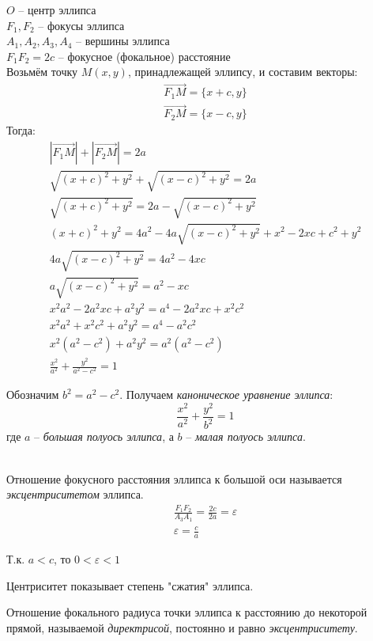 $O$ -- центр эллипса \\
 $F_1, F_2$ -- фокусы эллипса \\
 $A_1, A_2, A_3, A_4$ -- вершины эллипса \\
$F_1F_2 = 2c$  -- фокусное (фокальное) расстояние\\
Возьмём точку $M(x, y)$, принадлежащей эллипсу, и составим векторы:
\begin{gather*}
  \overrightarrow{F_1M} = \{x + c, y\} \\
  \overrightarrow{F_2M} = \{x - c, y\}
\end{gather*}
Тогда:
\begin{gather*}
  |\overrightarrow{F_1M}| + |\overrightarrow{F_2M}| = 2a \\
  \sqrt{(x + c)^2 + y^2} + \sqrt{(x - c)^2 + y^2} = 2a \\
  \sqrt{(x + c)^2 + y^2} = 2a - \sqrt{(x - c)^2 + y^2} \\
  (x + c)^2 + y^2 = 4a^2 - 4a\sqrt{(x - c)^2 + y^2} + x^2 - 2xc + c^2 + y^2 \\
  4a\sqrt{(x - c)^2 + y^2} = 4a^2 - 4xc \\
  a\sqrt{(x - c)^2 + y^2} = a^2 - xc \\
  x^2 a^2 - 2a^2xc + a^2y^2 = a^4 - 2a^2xc + x^2c^2 \\
  x^2a^2 + x^2c^2 + a^2y^2 = a^4 - a^2c^2 \\
  x^2(a^2 - c^2) + a^2y^2 = a^2(a^2 - c^2) \\
  \frac{x^2}{a^2} + \frac{y^2}{a^2 - c^2} = 1
\end{gather*} 

Обозначим $b^2 = a^2 - c^2$. Получаем \textit{каноническое уравнение эллипса}: \[
  \boxed{\frac{x^2}{a^2} + \frac{y^2}{b^2} = 1}
\]  
где $a$ -- \textit{большая полуось эллипса}, а  $b$ -- \textit{малая полуось эллипса}.


\\
Отношение фокусного расстояния эллипса к большой оси называется \textit{эксцентриситетом} эллипса.
\begin{gather*}
  \frac{F_1F_2}{A_3A_1} = \frac{2c}{2a} = \varepsilon \\
  \boxed{\varepsilon = \frac{c}{a}}
\end{gather*}
\begin{note}
  Т.к. $a < c$, то $0 < \varepsilon < 1$
\end{note}

Центриситет показывает степень "сжатия" эллипса.

Отношение фокального радиуса точки эллипса к расстоянию до некоторой прямой, называемой \textit{директрисой}, постоянно и равно \textit{эксцентриситету}. 

